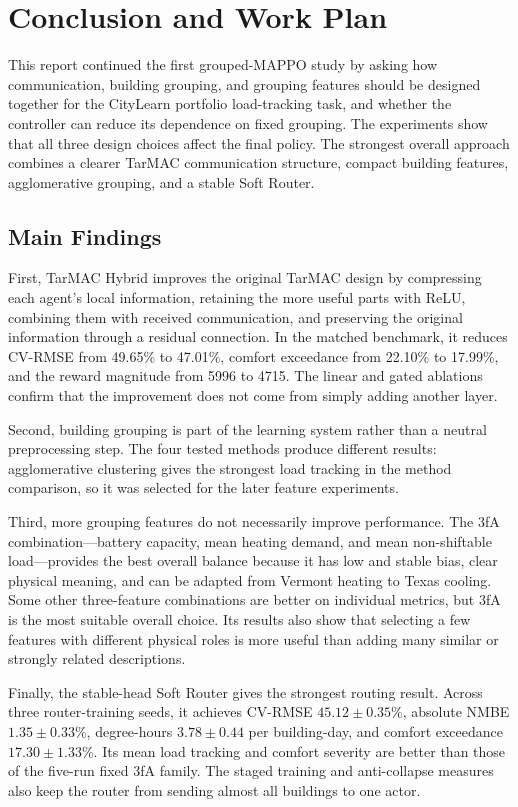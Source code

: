 \chapter{Conclusion and Work Plan}\label{ch:concl}

This report continued the first grouped-MAPPO study by asking how communication,
building grouping, and grouping features should be designed together for the
CityLearn portfolio load-tracking task, and whether the controller can reduce
its dependence on fixed grouping. The experiments show that all three design
choices affect the final policy. The strongest overall approach combines a
clearer TarMAC communication structure, compact building features,
agglomerative grouping, and a stable Soft Router.


\section{Main Findings}

First, TarMAC Hybrid improves the original TarMAC design by compressing each
agent's local information, retaining the more useful parts with ReLU, combining
them with received communication, and preserving the original information
through a residual connection. In the matched benchmark, it reduces CV-RMSE
from 49.65\% to 47.01\%, comfort exceedance from 22.10\% to 17.99\%, and the
reward magnitude from 5996 to 4715. The linear and gated ablations confirm that
the improvement does not come from simply adding another layer.

Second, building grouping is part of the learning system rather than a neutral
preprocessing step. The four tested methods produce different results:
agglomerative clustering gives the strongest load tracking in the method
comparison, so it was selected for the later feature experiments.

Third, more grouping features do not necessarily improve performance. The 3fA
combination---battery capacity, mean heating demand, and mean non-shiftable
load---provides the best overall balance because it has low and stable bias,
clear physical meaning, and can be adapted from Vermont heating to Texas
cooling. Some other three-feature combinations are better on individual
metrics, but 3fA is the most suitable overall choice. Its results also show that
selecting a few features with different physical roles is more useful than
adding many similar or strongly related descriptions.

Finally, the stable-head Soft Router gives the strongest routing result. Across
three router-training seeds, it achieves CV-RMSE $45.12\pm0.35$\%, absolute
NMBE $1.35\pm0.33$\%, degree-hours $3.78\pm0.44$ per building-day, and comfort
exceedance $17.30\pm1.33$\%. Its mean load tracking and comfort severity are
better than those of the five-run fixed 3fA family. The staged training and
anti-collapse measures also keep the router from sending almost all buildings
to one actor.


